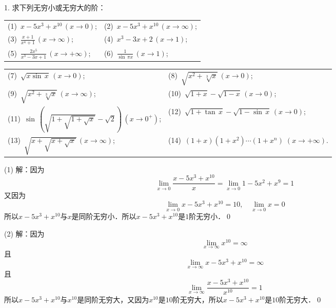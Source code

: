 \exercise

1. 求下列无穷小或无穷大的阶：

\begin{table}[H]
    \centering
    \begin{tabularx}{\textwidth} {  >{\raggedright\arraybackslash}X >{\raggedright\arraybackslash}X  }
       (1)~$x-5x^3+x^{10} \, (x \to 0)$; & (2)~$x-5x^3+x^{10} \, (x \to \infty)$; \\[1em]
       (3)~$\displaystyle\frac{x+1}{x^4+1} \, (x \to \infty)$; & (4)~$x^3-3x+2 \, (x \to 1)$; \\[1em]
       (5)~$\displaystyle\frac{2x^5}{x^3-3x+1} \, (x \to +\infty)$; & (6)~$\displaystyle\frac{1}{\sin \, \pi x} \, (x \to 1)$;
    \end{tabularx}
\end{table}

\pagebreak
\begin{table}[H]
    \centering
    \begin{tabularx}{\textwidth} {  >{\raggedright\arraybackslash}X >{\raggedright\arraybackslash}X  }
       (7)~$\sqrt{x\sin \, x} \, (x \to 0)$; & (8)~$\sqrt{x^2+\sqrt[3]{x}} \, (x \to 0)$; \\[1em]
       (9)~$\sqrt{x^2+\sqrt[3]{x}} \, (x \to \infty)$; & (10)~$\sqrt{1+x}-\sqrt{1-x} \, (x \to 0)$; \\[1em]
       (11)~$\sin \, \left(\displaystyle\sqrt{1+\displaystyle\sqrt{1+\displaystyle\sqrt{x}}}-\displaystyle\sqrt{2}\right) \, (x \to 0^+)$; & (12)~$\sqrt{1+\tan \, x} - \sqrt{1 - \sin \, x} \, (x \to 0)$; \\[1em]
       (13)~$\displaystyle\sqrt{x+\displaystyle\sqrt{x+\displaystyle\sqrt{x}}} \, (x \to \infty)$; & (14)~$(1+x)(1+x^2)\cdots(1+x^n) \; (x \to +\infty)$.
    \end{tabularx}
\end{table}

\medskip
(1) 解：因为
\begin{equation}
    \lim_{x \to 0} \frac{x-5x^3+x^{10}}{x} = \lim_{x \to 0} 1 - 5x^2+x^9 = 1
\end{equation}
又因为
\begin{equation}
    \lim_{x \to 0} x-5x^3+x^{10} = 10, \quad \lim_{x \to 0} x = 0
\end{equation}
所以$x-5x^3+x^{10}$与$x$是同阶无穷小．所以$x-5x^3+x^{10}$是$1$阶无穷小．\qed

\medskip
(2) 解：因为
\begin{equation}
    \lim_{x \to \infty} x^{10} = \infty
\end{equation}
且
\begin{equation}
    \lim_{x \to \infty} x-5x^3+x^{10} = \infty
\end{equation}
且
\begin{equation}
    \lim_{x \to \infty} \frac{x-5x^3+x^{10}}{x^{10}} = 1
\end{equation}
所以$x-5x^3+x^{10}$与$x^{10}$是同阶无穷大，又因为$x^{10}$是$10$阶无穷大，所以$x-5x^3+x^{10}$是$10$阶无穷大．\qed

